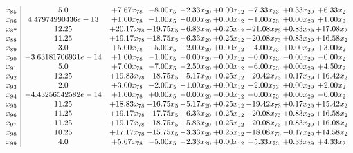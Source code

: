 \documentclass[8pt]{article}
\begin{document}
\[\begin{array}{c| c c@{\hskip 2pt} c@{\hskip 2pt} c@{\hskip 2pt} c@{\hskip 2pt} c@{\hskip 2pt} c@{\hskip 2pt} c@{\hskip 2pt} }
 x_{85}   &  5.0 & +  7.67 x_{78} & -8.00 x_{5} & -2.33 x_{20} & +  0.00 x_{12} & -7.33 x_{73} & +  0.33 x_{29} & +  6.33 x_{2}\\
 x_{86}   &  4.47974990436e-13 & +  1.00 x_{78} & -1.00 x_{5} & -0.00 x_{20} & +  0.00 x_{12} & -1.00 x_{73} & +  0.00 x_{29} & +  1.00 x_{2}\\
 x_{87}   &  12.25 & + 20.17 x_{78} & -19.75 x_{5} & -6.83 x_{20} & +  0.25 x_{12} & -21.08 x_{73} & +  0.83 x_{29} & + 17.08 x_{2}\\
 x_{88}   &  11.25 & + 19.17 x_{78} & -18.75 x_{5} & -6.33 x_{20} & +  0.25 x_{12} & -20.08 x_{73} & +  0.83 x_{29} & + 16.58 x_{2}\\
 x_{89}   &  3.0 & +  5.00 x_{78} & -5.00 x_{5} & -2.00 x_{20} & +  0.00 x_{12} & -4.00 x_{73} & +  0.00 x_{29} & +  3.00 x_{2}\\
 x_{90}   &  -3.63181706931e-14 & +  1.00 x_{78} & -1.00 x_{5} & -0.00 x_{20} & -0.00 x_{12} & +  0.00 x_{73} & -0.00 x_{29} & -0.00 x_{2}\\
 x_{91}   &  5.0 & +  7.00 x_{78} & -7.00 x_{5} & -2.50 x_{20} & +  0.00 x_{12} & -6.00 x_{73} & +  0.00 x_{29} & +  4.50 x_{2}\\
 x_{92}   &  12.25 & + 19.83 x_{78} & -18.75 x_{5} & -5.17 x_{20} & +  0.25 x_{12} & -20.42 x_{73} & +  0.17 x_{29} & + 16.42 x_{2}\\
 x_{93}   &  2.0 & +  3.00 x_{78} & -2.00 x_{5} & -1.00 x_{20} & +  0.00 x_{12} & -2.00 x_{73} & +  0.00 x_{29} & +  2.00 x_{2}\\
 x_{94}   &  -4.43256542582e-14 & +  1.00 x_{78} & +  0.00 x_{5} & -0.00 x_{20} & -0.00 x_{12} & +  0.00 x_{73} & +  0.00 x_{29} & -0.00 x_{2}\\
 x_{95}   &  11.25 & + 18.83 x_{78} & -16.75 x_{5} & -5.17 x_{20} & +  0.25 x_{12} & -19.42 x_{73} & +  0.17 x_{29} & + 15.42 x_{2}\\
 x_{96}   &  11.25 & + 19.17 x_{78} & -17.75 x_{5} & -6.33 x_{20} & +  0.25 x_{12} & -20.08 x_{73} & +  0.83 x_{29} & + 16.58 x_{2}\\
 x_{97}   &  11.25 & + 19.17 x_{78} & -18.75 x_{5} & -5.83 x_{20} & +  0.25 x_{12} & -20.08 x_{73} & +  0.83 x_{29} & + 16.08 x_{2}\\
 x_{98}   &  10.25 & + 17.17 x_{78} & -15.75 x_{5} & -3.33 x_{20} & +  0.25 x_{12} & -18.08 x_{73} & -0.17 x_{29} & + 14.58 x_{2}\\
 x_{99}   &  4.0 & +  5.67 x_{78} & -5.00 x_{5} & -2.33 x_{20} & +  0.00 x_{12} & -5.33 x_{73} & +  0.33 x_{29} & +  4.33 x_{2}\\

\end{array}\]
\end{document}
